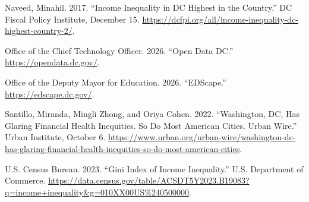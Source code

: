 \documentclass[
  letterpaper,
  DIV=11,
  numbers=noendperiod]{scrartcl}
\newlength{\cslhangindent}
\newenvironment{CSLReferences}[2] %
 {\begin{list}{}{%
  \setlength{\itemindent}{0pt}
  \setlength{\leftmargin}{0pt}
  \setlength{\parsep}{0pt}
  \ifodd #1
   \setlength{\leftmargin}{\cslhangindent}
   \setlength{\itemindent}{-1\cslhangindent}
  \fi
  \setlength{\itemsep}{#2\baselineskip}}}
 {\end{list}}
\begin{document}
\protect{}\label{refs}
\begin{CSLReferences}{1}{1}
Naveed, Minahil. 2017. {``Income Inequality in {DC} Highest in the
Country.''} DC Fiscal Policy Institute, December 15.
\url{https://dcfpi.org/all/income-inequality-dc-highest-country-2/}.

Office of the Chief Technology Officer. 2026. {``{Open Data DC}.''}
\url{https://opendata.dc.gov/}.

Office of the Deputy Mayor for Education. 2026. {``{EDScape}.''}
\url{https://edscape.dc.gov/}.

Santillo, Miranda, Mingli Zhong, and Oriya Cohen. 2022. {``Washington,
{DC}, Has Glaring Financial Health Inequities. So Do Most {American}
Cities. Urban Wire.''} Urban Institute, October 6.
\url{https://www.urban.org/urban-wire/washington-dc-has-glaring-financial-health-inequities-so-do-most-american-cities}.

U.S. Census Bureau. 2023. {``Gini Index of Income Inequality.''} U.S.
Department of Commerce.
\url{https://data.census.gov/table/ACSDT5Y2023.B19083?q=income+inequality&g=010XX00US\%240500000}.

\end{CSLReferences}
\end{document}
